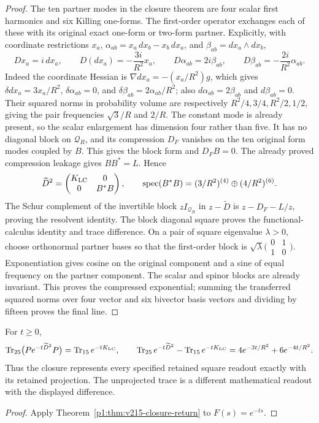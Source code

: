 \documentclass[11pt]{article}
\begin{document}
\begin{proof}
The ten partner modes in the closure theorem are four scalar first
harmonics and six Killing one-forms. The first-order operator exchanges
each of these with its original exact one-form or two-form partner.
Explicitly, with coordinate restrictions \(x_a\),
\(\alpha_{ab}=x_a\,dx_b-x_b\,dx_a\), and
\(\beta_{ab}=dx_a\wedge dx_b\),
\[
 D x_a=i\,dx_a,\qquad D(dx_a)=-\frac{3i}{R^2}x_a,
 \qquad D\alpha_{ab}=2i\beta_{ab},\qquad
 D\beta_{ab}=-\frac{2i}{R^2}\alpha_{ab}.
\]
Indeed the coordinate Hessian is
\(\nabla dx_a=-(x_a/R^2)g\), which gives
\(\delta dx_a=3x_a/R^2\), \(\delta\alpha_{ab}=0\), and
\(\delta\beta_{ab}=2\alpha_{ab}/R^2\); also
\(d\alpha_{ab}=2\beta_{ab}\) and \(d\beta_{ab}=0\).
Their squared norms in probability volume are respectively
\(R^2/4,3/4,R^2/2,1/2\), giving the pair frequencies
\(\sqrt3/R\) and \(2/R\). The constant mode is already present,
so the scalar enlargement has dimension four rather than five.
It has no diagonal block on \(\mathcal Q_R\), and its compression
\(D_F\) vanishes on the ten original form modes coupled by \(B\).
This gives the block form and \(D_FB=0\). The already proved
compression leakage gives \(BB^*=L\). Hence
\[
 \widetilde D^2=
 \begin{pmatrix}K_{\rm LC}&0\\0&B^*B\end{pmatrix},\qquad
 \operatorname{spec}(B^*B)
       =(3/R^2)^{(4)}\oplus(4/R^2)^{(6)}.
\]
The Schur complement of the invertible block \(zI_{\mathcal Q_R}\)
in \(z-\widetilde D\) is \(z-D_F-L/z\), proving the resolvent
identity. The block diagonal square proves the functional-calculus
identity and trace difference. On a pair of square eigenvalue
\(\lambda>0\), choose orthonormal partner bases so that the
first-order block is
\(\sqrt\lambda\bigl(\begin{smallmatrix}0&1\\1&0\end{smallmatrix}\bigr)\).
Exponentiation gives cosine on the original component and a sine
of equal frequency on the partner component. The scalar and spinor
blocks are already invariant. This proves the compressed exponential;
summing the transferred squared norms over four vector and six
bivector basis vectors and dividing by fifteen proves the final line.
\end{proof}

\begin{corollary}
\label{p1:cor:v215-projected-heat-trace}
For \(t\geq0\),
\[
 \operatorname{Tr}_{25}\bigl(Pe^{-t\widetilde D^2}P\bigr)
 =\operatorname{Tr}_{15}e^{-tK_{\rm LC}},\qquad
 \operatorname{Tr}_{25}e^{-t\widetilde D^2}
 -\operatorname{Tr}_{15}e^{-tK_{\rm LC}}
 =4e^{-3t/R^2}+6e^{-4t/R^2}.
\]
Thus the closure represents every specified retained square readout
exactly with its retained projection. The unprojected trace is a
different mathematical readout with the displayed difference.
\end{corollary}
\begin{proof}
Apply Theorem~\ref{p1:thm:v215-closure-return} to \(F(s)=e^{-ts}\).
\end{proof}
\end{document}

